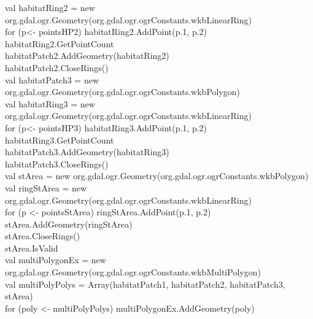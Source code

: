 \documentclass {article}
\begin{document}
val habitatRing2 = new org.gdal.ogr.Geometry(org.gdal.ogr.ogrConstants.wkbLinearRing)\\
for (p<- pointsHP2) habitatRing2.AddPoint(p.\underline{\space}1, p.\underline{\space}2)\\
habitatRing2.GetPointCount\\
habitatPatch2.AddGeometry(habitatRing2)\\
habitatPatch2.CloseRings()\\
val habitatPatch3 = new org.gdal.ogr.Geometry(org.gdal.ogr.ogrConstants.wkbPolygon)\\
val habitatRing3 = new org.gdal.ogr.Geometry(org.gdal.ogr.ogrConstants.wkbLinearRing)\\
for (p<- pointsHP3) habitatRing3.AddPoint(p.\underline{\space}1, p.\underline{\space}2)\\
habitatRing3.GetPointCount\\
habitatPatch3.AddGeometry(habitatRing3)\\
habitatPatch3.CloseRings()\\
val stArea = new org.gdal.ogr.Geometry(org.gdal.ogr.ogrConstants.wkbPolygon)\\
val ringStArea = new org.gdal.ogr.Geometry(org.gdal.ogr.ogrConstants.wkbLinearRing)\\
for (p <- pointsStArea) ringStArea.AddPoint(p.\underline{\space}1, p.\underline{\space}2)\\
stArea.AddGeometry(ringStArea)\\
stArea.CloseRings()\\
stArea.IsValid\\
val multiPolygonEx = new org.gdal.ogr.Geometry(org.gdal.ogr.ogrConstants.wkbMultiPolygon) \\
val multiPolyPolys = Array(habitatPatch1, habitatPatch2, habitatPatch3, stArea) \\
for (poly <- multiPolyPolys) multiPolygonEx.AddGeometry(poly)  
\\
\\
\end{document}
